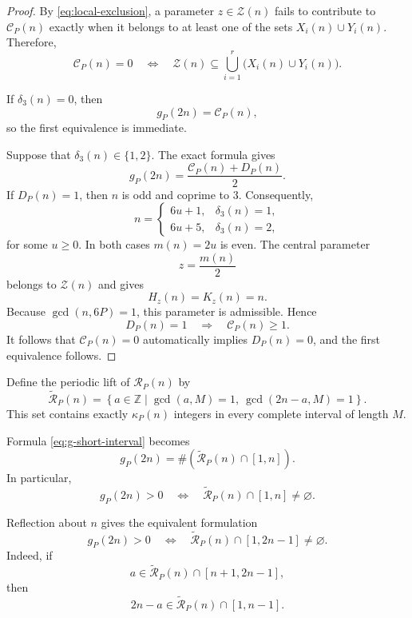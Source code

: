 \documentclass[12pt]{article}
\numberwithin{equation}{section}
\theoremstyle{definition}
\theoremstyle{remark}
\newcommand{\Z}{\mathbb Z}
\newcommand{\Ccal}{\mathcal C}
\newcommand{\Rcal}{\mathcal R}
\newcommand{\Zcal}{\mathcal Z}
\begin{document}
\begin{proof}
By \eqref{eq:local-exclusion}, a parameter
$z\in\Zcal(n)$ fails to contribute to $\Ccal_P(n)$ exactly when
it belongs to at least one of the sets
$X_i(n)\cup Y_i(n)$. Therefore,
\[
\Ccal_P(n)=0
\quad\Longleftrightarrow\quad
\Zcal(n)
\subseteq
\bigcup_{i=1}^{r}
\bigl(X_i(n)\cup Y_i(n)\bigr).
\]

If $\delta_3(n)=0$, then
\[
g_P(2n)=\Ccal_P(n),
\]
so the first equivalence is immediate.

Suppose that $\delta_3(n)\in\{1,2\}$. The exact formula gives
\[
g_P(2n)
=
\frac{\Ccal_P(n)+D_P(n)}2.
\]
If $D_P(n)=1$, then $n$ is odd and coprime to $3$. Consequently,
\[
n=
\begin{cases}
6u+1, & \delta_3(n)=1,\\
6u+5, & \delta_3(n)=2,
\end{cases}
\]
for some $u\geq0$. In both cases $m(n)=2u$ is even. The central
parameter
\[
z=\frac{m(n)}2
\]
belongs to $\Zcal(n)$ and gives
\[
H_z(n)=K_z(n)=n.
\]
Because $\gcd(n,6P)=1$, this parameter is admissible. Hence
\[
D_P(n)=1
\quad\Longrightarrow\quad
\Ccal_P(n)\geq1.
\]
It follows that $\Ccal_P(n)=0$ automatically implies
$D_P(n)=0$, and the first equivalence follows.
\end{proof}

Define the periodic lift of $\Rcal_P(n)$ by
\begin{equation}
\label{eq:R-lift}
\widetilde{\Rcal}_P(n)
=
\left\{
a\in\Z
\mathrel{}\middle|\mathrel{}
\gcd(a,M)=1,\
\gcd(2n-a,M)=1
\right\}.
\end{equation}
This set contains exactly $\kappa_P(n)$ integers in every
complete interval of length $M$.

Formula \eqref{eq:g-short-interval} becomes
\begin{equation}
\label{eq:g-lift-cardinality}
g_P(2n)
=
\#
\left(
\widetilde{\Rcal}_P(n)\cap[1,n]
\right).
\end{equation}
In particular,
\begin{equation}
\label{eq:g-lift-short}
g_P(2n)>0
\quad\Longleftrightarrow\quad
\widetilde{\Rcal}_P(n)\cap[1,n]\neq\varnothing.
\end{equation}

Reflection about $n$ gives the equivalent formulation
\begin{equation}
\label{eq:g-lift-long}
g_P(2n)>0
\quad\Longleftrightarrow\quad
\widetilde{\Rcal}_P(n)\cap[1,2n-1]\neq\varnothing.
\end{equation}
Indeed, if
\[
a\in\widetilde{\Rcal}_P(n)\cap[n+1,2n-1],
\]
then
\[
2n-a\in\widetilde{\Rcal}_P(n)\cap[1,n-1].
\]
\end{document}
